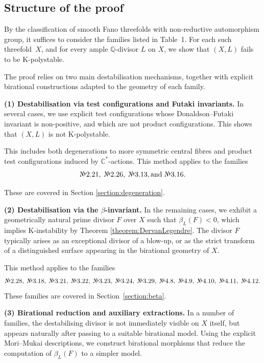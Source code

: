 \documentclass[12pt]{amsart}
\theoremstyle{definition}
\theoremstyle{remark}
\newcommand{\C}{\mathbb{C}}
\begin{document}
\subsection*{Structure of the proof}

By the classification of smooth Fano threefolds with non-reductive automorphism group, it suffices to consider the families listed in Table~1.
For each such threefold~$X$, and for every ample $\mathbb{Q}$-divisor $L$ on $X$, we show that $(X,L)$ fails to be K-polystable.

The proof relies on two main destabilisation mechanisms, together with explicit birational constructions adapted to the geometry of each family.

\medskip

\noindent
\textbf{(1) Destabilisation via test configurations and Futaki invariants.}
In several cases, we use explicit test configurations whose Donaldson--Futaki invariant is non-positive, and which are not product configurations. This shows that $(X,L)$ is not K-polystable.

This includes both degenerations to more symmetric central fibres and product test configurations induced by $\C^*$-actions. This method applies to the families
\[
\text{\textnumero } 2.21,\;
\text{\textnumero } 2.26,\;
\text{\textnumero } 3.13,\text{and } \text{\textnumero } 3.16.
\]

These are covered in Section \ref{section:degeneration}.

\medskip

\noindent
\textbf{(2) Destabilisation via the $\beta$-invariant.}
In the remaining cases, we exhibit a geometrically natural prime divisor $F$ over $X$ such that $\beta_L(F) < 0$, which implies K-instability by Theorem \ref{theorem:DervanLegendre}. The divisor $F$ typically arises as an exceptional divisor of a blow-up, or as the strict transform of a distinguished surface appearing in the birational geometry of $X$.

This method applies to the families
\[
\text{\textnumero } 2.28,\;
\text{\textnumero } 3.18,\;
\text{\textnumero } 3.21,\;
\text{\textnumero } 3.22,\;
\text{\textnumero } 3.23,\;
\text{\textnumero } 3.24,\;
\text{\textnumero } 3.29,\;
\text{\textnumero } 4.8,\;
\text{\textnumero } 4.9,\;
\text{\textnumero } 4.10,\;
\text{\textnumero } 4.11,\;
\text{\textnumero } 4.12.
\]
These families are covered in Section~\ref{section:beta}.

\medskip

\noindent
\textbf{(3) Birational reduction and auxiliary extractions.}
In a number of families, the destabilising divisor is not immediately visible on $X$ itself, but appears naturally after passing to a suitable birational model. Using the explicit Mori--Mukai descriptions, we construct birational morphisms that reduce the computation of $\beta_L(F)$ to a simpler model.
\end{document}
